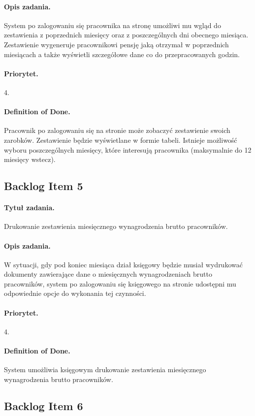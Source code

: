 \documentclass[a4paper]{article}
\begin{document}
\paragraph{Opis zadania.} System po zalogowaniu się pracownika na stronę umożliwi mu wgląd do zestawienia z poprzednich miesięcy oraz z poszczególnych dni obecnego miesiąca. Zestawienie wygeneruje pracownikowi pensję jaką otrzymał w poprzednich miesiącach a także wyświetli szczegółowe dane co do przepracowanych godzin.
\paragraph{Priorytet.} 4.
\paragraph{Definition of Done.} Pracownik po zalogowaniu się na stronie może zobaczyć zestawienie swoich zarobków. Zestawienie będzie wyświetlane w formie tabeli. Istnieje możliwość wyboru poszczególnych miesięcy, które interesują pracownika (maksymalnie do 12 miesięcy wstecz).

\subsection{Backlog Item 5}
\paragraph{Tytuł zadania.} Drukowanie zestawienia miesięcznego wynagrodzenia brutto pracowników.
\paragraph{Opis zadania.} W sytuacji, gdy pod koniec miesiąca dział księgowy będzie musiał wydrukować dokumenty zawierające dane o miesięcznych wynagrodzeniach brutto pracowników, system po zalogowaniu się księgowego na stronie udostępni mu odpowiednie opcje do wykonania tej czynności.
\paragraph{Priorytet.} 4.
\paragraph{Definition of Done.} System umożliwia księgowym drukowanie zestawienia miesięcznego wynagrodzenia brutto pracowników.

\subsection{Backlog Item 6}
\end{document}
